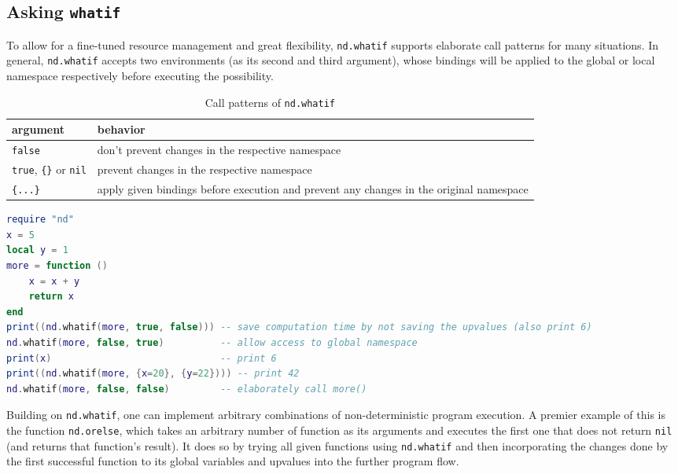\subsection{Asking \texttt{whatif}}
\label{sec:whatif}

To allow for a fine-tuned resource management and great flexibility, \texttt{nd.whatif} supports elaborate call patterns for many situations. In general, \texttt{nd.whatif} accepts two environments (as its second and third argument), whose bindings will be applied to the global or local namespace respectively before executing the possibility.

\begin{comment}
TODO: update nd.whatif to include an option (_true_ or nil?) to ERADICATE said namespace and execute in plain environment.
\end{comment}

 \begin{table}[h]
 \caption{Call patterns of \texttt{nd.whatif}}
 \begin{tabular}{l|p{300pt}}
argument  & behavior\\
\hline
\texttt{false} & don't prevent changes in the respective namespace\\
\texttt{true}, \texttt{\{\}} or \texttt{nil} & prevent changes in the respective namespace \\
\texttt{\{...\}} & apply given bindings before execution and prevent any changes in the original namespace\\
 \end{tabular}
 \label{tab:whatif}
 \end{table}

\begin{lstlisting}[language=lua, caption={Example for the call patterns of \texttt{nd.whatif} (see table \ref{tab:whatif})}, label=lst:whatif, name=lst:whatif]
require "nd"
x = 5
local y = 1
more = function ()
	x = x + y
	return x
end
print((nd.whatif(more, true, false))) -- save computation time by not saving the upvalues (also print 6)
nd.whatif(more, false, true)          -- allow access to global namespace
print(x)                              -- print 6
print((nd.whatif(more, {x=20}, {y=22}))) -- print 42
nd.whatif(more, false, false)         -- elaborately call more()
\end{lstlisting}

Building on \texttt{nd.whatif}, one can implement arbitrary combinations of non-deterministic program execution. A premier example of this is the function \texttt{nd.orelse}, which takes an arbitrary number of function as its arguments and executes the first one that does not return \texttt{nil} (and returns that function's result). It does so by trying all given functions using \texttt{nd.whatif} and then incorporating the changes done by the first successful function to its global variables and upvalues into the further program flow.


